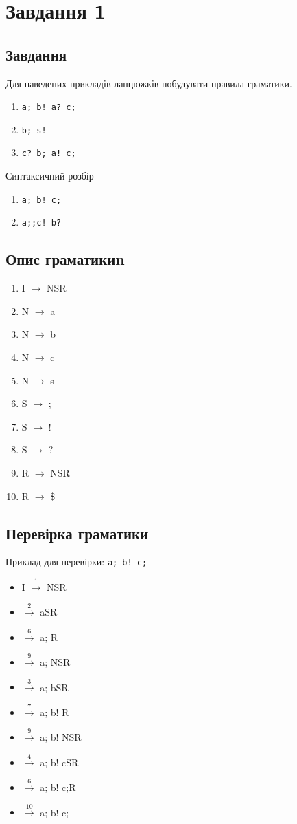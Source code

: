 \section{Завдання 1}
\subsection{Завдання}
Для наведених прикладів ланцюжків побудувати правила граматики.
\begin{enumerate}
    \item \verb|a; b! a? c;|
    \item \verb|b; s!|
    \item \verb|c? b; a! c;|
\end{enumerate}
Синтаксичний розбір
\begin{enumerate}
    \item \verb|a; b! c;|
    \item \verb|a;;c! b?|
\end{enumerate}

\subsection{Опис граматикиn}
\begin{enumerate}
    \item  I $\to$ NSR
    \item  N $\to$ a
    \item  N $\to$ b
    \item  N $\to$ c
    \item  N $\to$ s
    \item  S $\to$ ;
    \item  S $\to$ !
    \item  S $\to$ ?
    \item  R $\to$ NSR
    \item  R $\to$ \$
\end{enumerate}


\newpage
\subsection{Перевірка граматики}
Приклад для перевірки: \verb|a; b! c;|
\begin{itemize}
    \item[]  I $\xrightarrow{1}$ NSR
    \item[]  $\xrightarrow{2}$ aSR
    \item[]  $\xrightarrow{6}$ a; R
    \item[]  $\xrightarrow{9}$ a; NSR
    \item[]  $\xrightarrow{3}$ a; bSR
    \item[]  $\xrightarrow{7}$ a; b! R
    \item[]  $\xrightarrow{9}$ a; b! NSR
    \item[]  $\xrightarrow{4}$ a; b! cSR
    \item[]  $\xrightarrow{6}$ a; b! c;R
    \item[]  $\xrightarrow{10}$ a; b! c;
\end{itemize}

